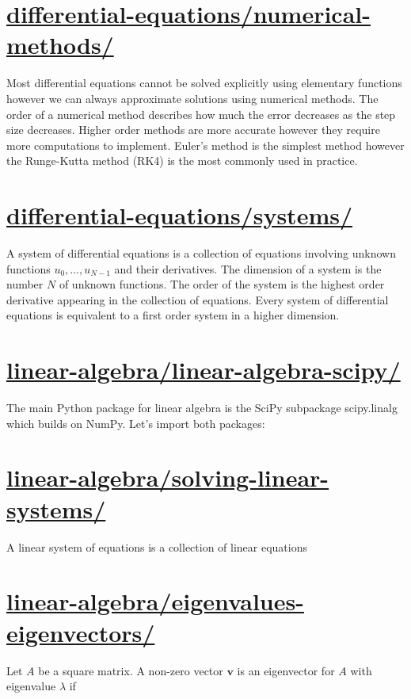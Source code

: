 \documentclass[12pt]{article}
\begin{document}
\section{\href{https://patrickwalls.github.io/mathematicalpython/differential-equations/numerical-methods/}{differential-equations/numerical-methods/}}
Most differential equations cannot be solved explicitly using elementary functions however we can always approximate solutions using numerical methods. The order of a numerical method describes how much the error decreases as the step size decreases. Higher order methods are more accurate however they require more computations to implement. Euler's method is the simplest method however the Runge-Kutta method (RK4) is the most commonly used in practice.
\vspace{1cm}
\section{\href{https://patrickwalls.github.io/mathematicalpython/differential-equations/systems/}{differential-equations/systems/}}
A system of differential equations is a collection of equations involving unknown functions $u_0,\dots,u_{N-1}$ and their derivatives. The dimension of a system is the number $N$ of unknown functions. The order of the system is the highest order derivative appearing in the collection of equations. Every system of differential equations is equivalent to a first order system in a higher dimension.
\vspace{1cm}
\section{\href{https://patrickwalls.github.io/mathematicalpython/linear-algebra/linear-algebra-scipy/}{linear-algebra/linear-algebra-scipy/}}
The main Python package for linear algebra is the SciPy subpackage scipy.linalg which builds on NumPy. Let's import both packages:
\vspace{1cm}
\section{\href{https://patrickwalls.github.io/mathematicalpython/linear-algebra/solving-linear-systems/}{linear-algebra/solving-linear-systems/}}
A linear system of equations is a collection of linear equations
\vspace{1cm}
\section{\href{https://patrickwalls.github.io/mathematicalpython/linear-algebra/eigenvalues-eigenvectors/}{linear-algebra/eigenvalues-eigenvectors/}}
Let $A$ be a square matrix. A non-zero vector $\mathbf{v}$ is an eigenvector for $A$ with eigenvalue $\lambda$ if
\vspace{1cm}
\end{document}
